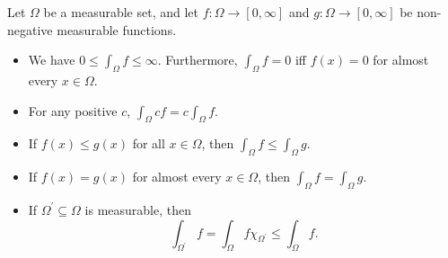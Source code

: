 \begin{proposition} \label{prop: measurable func integral property}
    Let \(\Omega\) be a measurable set, and let \(f: \Omega \to [0, \infty]\) and \(g: \Omega \to [0, \infty]\) be non-negative measurable functions. 
    \begin{itemize}
        \item [(a)] We have \(0 \le \int _\Omega f \le \infty\). Furthermore, \(\int _\Omega f = 0\) iff \(f(x) = 0\) for almost every \(x \in \Omega\). 
        \item [(b)] For any positive \(c\), \(\int _\Omega cf = c \int _\Omega f\). 
        \item [(c)] If \(f(x) \le g(x)\) for all \(x \in \Omega\), then \(\int _\Omega f \le \int _\Omega g\). 
        \item [(d)] If \(f(x) = g(x)\) for almost every \(x \in \Omega\), then \(\int _\Omega f = \int _\Omega g\).
        \item [(e)] If \(\Omega ^{\prime} \subseteq \Omega \) is measurable, then 
        \[
            \int _{\Omega ^{\prime} } f = \int _\Omega f \chi _{\Omega ^{\prime} } \le \int _{\Omega } f.
        \]
    \end{itemize}   
\end{proposition}

